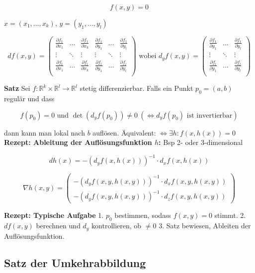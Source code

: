 \[
    f(x, y) = 0
\]

$x = (x_1, ..., x_k)$, $y = (y_1, ..., y_l)$

\[
    df(x, y) =
        \begin{pmatrix}
            \frac{\partial f_1}{\partial x_1} & \hdots & \frac{\partial f_1}{\partial x_k}
            & \frac{\partial f_1}{\partial y_1} & \hdots & \frac{\partial f_1}{\partial y_l}\\
            
            \vdots & \ddots & \vdots & \vdots & \ddots & \vdots\\
            
            \frac{\partial f_l}{\partial x_1} & \hdots & \frac{\partial f_l}{\partial x_k}
            & \frac{\partial f_l}{\partial y_1} & \hdots & \frac{\partial f_l}{\partial y_l}\\
        \end{pmatrix} \text{ wobei }
    d_yf(x, y) =
        \begin{pmatrix}
            \frac{\partial f_1}{\partial y_1} & \hdots & \frac{\partial f_1}{\partial y_l}\\
            
            \vdots & \ddots & \vdots\\
            
            \frac{\partial f_l}{\partial y_1} & \hdots & \frac{\partial f_l}{\partial y_l}\\
        \end{pmatrix}
\]

\textbf{Satz} Sei $f: \mathbb{R}^k \times \mathbb{R}^l \to \mathbb{R}^l$ stetig differenzierbar. Falls ein Punkt $p_0 = (a, b)$ regulär und dass

\[
    f(p_0) = 0 \text{ und } \det(d_y f(p_0)) \neq 0\ (\iff d_y f(p_0) \text{ ist invertierbar})
\]

dann kann man lokal nach $b$ auflösen. Äquivalent: $\iff \exists h: f(x, h(x)) = 0$\\

\textbf{Rezept: Ableitung der Auflösungsfunktion $h$:} Bsp 2- oder 3-dimensional

\[
    dh(x) = -(d_y f(x, h(x)))^{-1} \cdot d_x f(x, h(x))
\]


\[
    \nabla h(x, y) =
        \begin{pmatrix}
            -(d_y f(x, y, h(x, y)))^{-1} \cdot d_x f(x, y, h(x, y))\\
            -(d_y f(x, y, h(x, y)))^{-1} \cdot d_z f(x, y, h(x, y))
        \end{pmatrix}
\]

\textbf{Rezept: Typische Aufgabe} 1. $p_0$ bestimmen, sodass $f(x, y)=0$ stimmt. 2. $df(x, y)$ berechnen und $d_y$ kontrollieren, ob $\neq 0$ 3. Satz bewiesen, Ableiten der Auflösungsfunktion.

\subsection{Satz der Umkehrabbildung}

